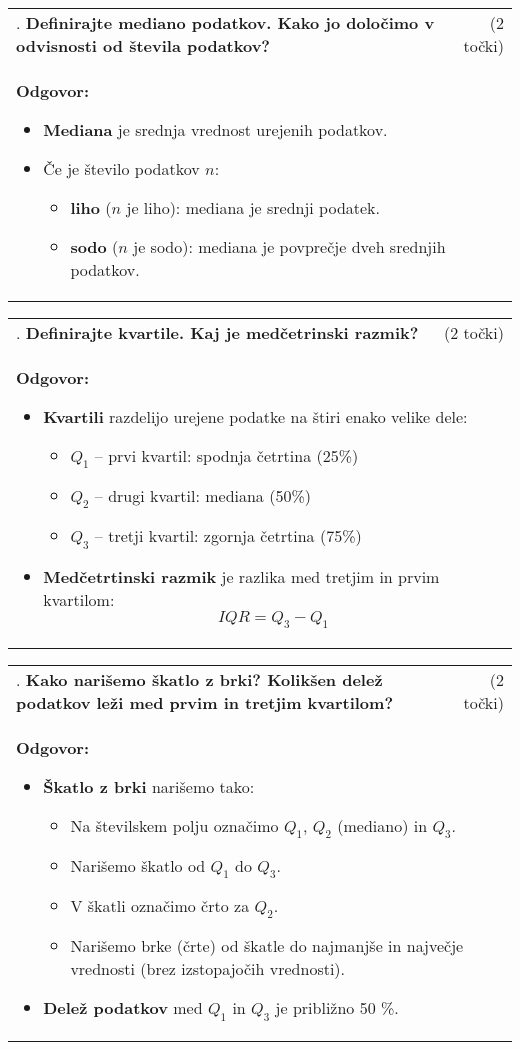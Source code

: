 \documentclass[12pt]{article}
\newcounter{vprasanje}[section]
\renewcommand{\thevprasanje}{\roman{vprasanje}}
\newcommand{\vprasanje}[2]{%
  \stepcounter{vprasanje}%
  \textbf{\thevprasanje}. \textbf{#1} & (#2) \\
}
\newcommand{\odgovor}[1]{%
  \multicolumn{2}{p{\dimexpr\textwidth-2\tabcolsep\relax}}{%
    \small \textbf{Odgovor:} #1%
  } \\[1em]%
}
\begin{document}
\begin{tabularx}{\textwidth}{X r}
\vprasanje{Definirajte mediano podatkov. Kako jo določimo v odvisnosti od števila podatkov?}{2 točki}
\odgovor{
\begin{itemize}
  \item \textbf{Mediana} je srednja vrednost urejenih podatkov.
  \item Če je število podatkov $n$:
  \begin{itemize}
    \item \textbf{liho} ($n$ je liho): mediana je srednji podatek.
    \item \textbf{sodo} ($n$ je sodo): mediana je povprečje dveh srednjih podatkov.
  \end{itemize}
\end{itemize}
}
\end{tabularx}

\begin{tabularx}{\textwidth}{X r}
\vprasanje{Definirajte kvartile. Kaj je medčetrinski razmik?}{2 točki}
\odgovor{
\begin{itemize}
  \item \textbf{Kvartili} razdelijo urejene podatke na štiri enako velike dele:
  \begin{itemize}
    \item $Q_1$ – prvi kvartil: spodnja četrtina (25\%)
    \item $Q_2$ – drugi kvartil: mediana (50\%)
    \item $Q_3$ – tretji kvartil: zgornja četrtina (75\%)
  \end{itemize}
  \item \textbf{Medčetrtinski razmik} je razlika med tretjim in prvim kvartilom:
  \[
  IQR = Q_3 - Q_1
  \]
\end{itemize}
}
\end{tabularx}

\begin{tabularx}{\textwidth}{X r}
\vprasanje{Kako narišemo škatlo z brki? Kolikšen delež podatkov leži med prvim in tretjim kvartilom?}{2 točki}
\odgovor{
\begin{itemize}
  \item \textbf{Škatlo z brki} narišemo tako:
  \begin{itemize}
    \item Na številskem polju označimo $Q_1$, $Q_2$ (mediano) in $Q_3$.
    \item Narišemo škatlo od $Q_1$ do $Q_3$.
    \item V škatli označimo črto za $Q_2$.
    \item Narišemo brke (črte) od škatle do najmanjše in največje vrednosti (brez izstopajočih vrednosti).
  \end{itemize}
  \item \textbf{Delež podatkov} med $Q_1$ in $Q_3$ je približno 50 \%.
\end{itemize}
}
\end{tabularx}
\end{document}
